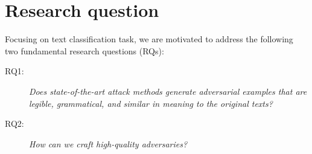 \section{Research question}\label{sec:research-question}

Focusing on text classification task, we are motivated to address the following two fundamental research questions (RQs):

\begin{description}
    \item[RQ1:] \emph{Does state-of-the-art attack methods generate adversarial examples that are legible, grammatical, and similar in meaning to the original texts?}
    \item[RQ2:] \emph{How can we craft high-quality adversaries?}
\end{description}

